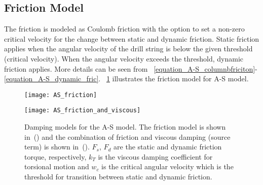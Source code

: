 \subsection{Friction Model}
\label{sec:asfrictionmodel}
The friction is modeled as Coulomb friction with the option to set a non-zero critical velocity for the change between static and dynamic friction.  Static friction applies when the angular velocity of the drill string is below the given threshold (critical velocity). When the angular velocity exceeds the threshold, dynamic friction applies. More details can be seen from \equationname~\ref{equation_A-S_columnbfriciton}-\ref{equation_A-S_dynamic_fric}. \figurename~\ref{figure_AS_damping} illustrates the friction model for A-S model.
\begin{figure}
	\begin{minipage}[t]{\linewidth}
			\begin{minipage}[t]{0.45\linewidth}
				\centering
				\texttt{[image: AS\_friction]}
				\label{fig:asfriction}
			\end{minipage}
			\hfill
			\begin{minipage}[t]{0.45\linewidth}
				\centering
				\texttt{[image: AS\_friction\_and\_viscous]}
				\label{fig:asfrictionandviscous}
			\end{minipage}
	\end{minipage}
    \caption[Damping models for the A-S model]{Damping models for the A-S model. The friction model is shown in~() and the combination of friction and viscous damping (source term) is shown in~(). $F_{s}$, $F_{d}$ are the static and dynamic friction torque, respectively, $k_{T}$ is the viscous damping coefficient for torsional motion and $w_{c}$ is the critical angular velocity which is the threshold for transition between static and dynamic friction.}
	\label{figure_AS_damping}
\end{figure}

